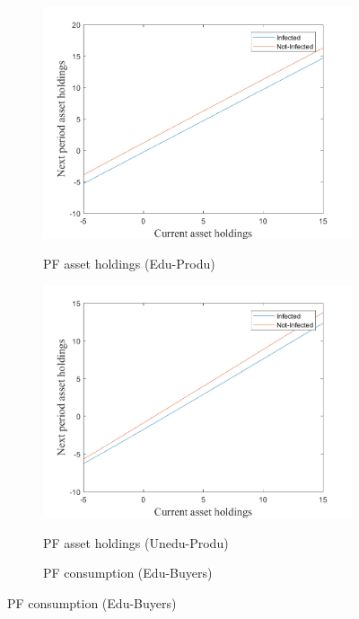 \begin{figure}[H]
\bigskip
\begin{subfigure}{0.5\textwidth}\caption{PF asset holdings (Edu-Produ)}
   \includegraphics[width=\linewidth,height = 0.22\textheight]{figures/matu/FIG3.png}
    \label{fig_dert}
\end{subfigure}
\hspace*{\fill}
\begin{subfigure}{0.5\textwidth}\caption{PF asset holdings (Unedu-Produ)}
   \includegraphics[width=\linewidth,height = 0.22\textheight]{figures/matu/FIG4.png}
    \label{fig:x_b}
\end{subfigure}
\bigskip
\begin{subfigure}{0.5\textwidth}\caption{PF consumption (Edu-Buyers)}

\end{subfigure}
\end{figure}
